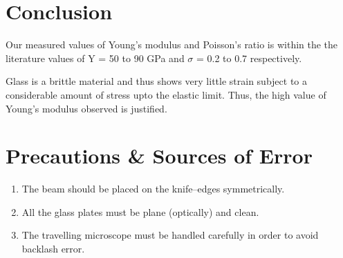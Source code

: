 \section{Conclusion}
Our measured values of Young's modulus and Poisson's ratio is within the the literature values of Y = 50 to 90 GPa and $\sigma$ = 0.2 to 0.7 respectively.

Glass is a brittle material and thus shows very little strain subject to a considerable amount of stress upto the elastic limit. Thus, the high value of Young's modulus observed is justified.

\section{Precautions \& Sources of Error}
\begin{enumerate}
    \item The beam should be placed on the knife–edges symmetrically.
    \item All the glass plates must be plane (optically) and clean.
    \item The travelling microscope must be handled carefully in order to avoid backlash error.
\end{enumerate}